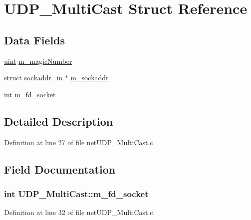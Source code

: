 \hypertarget{structUDP__MultiCast}{}\section{U\+D\+P\+\_\+\+Multi\+Cast Struct Reference}
\label{structUDP__MultiCast}
\subsection*{Data Fields}
\begin{DoxyCompactItemize}
\item 
\hyperlink{tcp_8h_a91ad9478d81a7aaf2593e8d9c3d06a14}{uint} \hyperlink{structUDP__MultiCast_a302e6559f2c43ceb1c1717df6d85a5af}{m\+\_\+magic\+Number}
\item 
struct sockaddr\+\_\+in $\ast$ \hyperlink{structUDP__MultiCast_a77b48c8d6a168eb7be239211367f8ca3}{m\+\_\+sockaddr}
\item 
int \hyperlink{structUDP__MultiCast_a4fc624b545b724ea4ea43dbf3505797c}{m\+\_\+fd\+\_\+socket}
\end{DoxyCompactItemize}


\subsection{Detailed Description}


Definition at line 27 of file net\+U\+D\+P\+\_\+\+Multi\+Cast.\+c.



\subsection{Field Documentation}
\subsubsection[{\texorpdfstring{m\+\_\+fd\+\_\+socket}{m_fd_socket}}]{\setlength{\rightskip}{0pt plus 5cm}int U\+D\+P\+\_\+\+Multi\+Cast\+::m\+\_\+fd\+\_\+socket}\hypertarget{structUDP__MultiCast_a4fc624b545b724ea4ea43dbf3505797c}{}\label{structUDP__MultiCast_a4fc624b545b724ea4ea43dbf3505797c}


Definition at line 32 of file net\+U\+D\+P\+\_\+\+Multi\+Cast.\+c.



